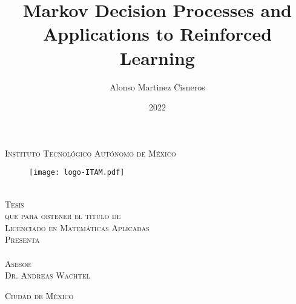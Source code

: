 \documentclass[11pt, oneside]{book}
\theoremstyle{definition}
\begin{document}

\title{Markov Decision Processes and Applications to Reinforced Learning}
\author{Alonso Martinez Cisneros}
\date{2022}

\makeatletter
\begin{titlepage}
\begin{center}

\textsc{\Large Instituto Tecnológico Autónomo de México}\\[2em]

\begin{figure}[h]
\begin{center}
\texttt{[image: logo-ITAM.pdf]}
\end{center}
\end{figure}

\textbf{\LARGE \@title }\\[2em]

\textsc{\large Tesis}\\[1em]

\textsc{\large que para obtener el título de}\\[1em]

\textsc{\LARGE Licenciado en Matemáticas Aplicadas}\\[1em]

\textsc{\large Presenta}\\[1em]

\textsc{\LARGE \@author}\\[1em]

\textsc{\large Asesor}\\[1em]

\textsc{\LARGE Dr. Andreas Wachtel}\\[2em]

\end{center}

\vspace*{\fill}
\textsc{Ciudad de México \hspace*{\fill} \@date}

\end{titlepage}
\makeatother

\end{document}
